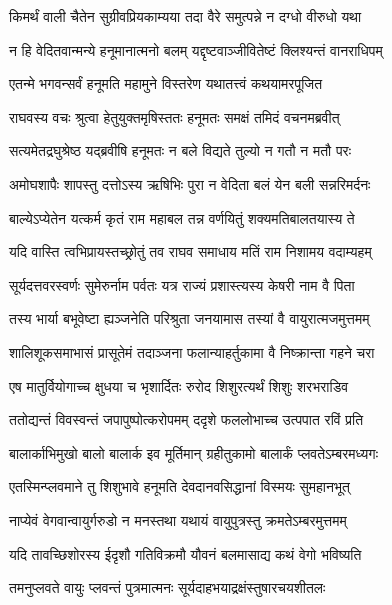 \twolineshloka
{किमर्थं वाली चैतेन सुग्रीवप्रियकाम्यया}
{तदा वैरे समुत्पन्ने न दग्धो वीरुधो यथा} %

\twolineshloka
{न हि वेदितवान्मन्ये हनूमानात्मनो बलम्}
{यद्दृष्टवाञ्जीवितेष्टं क्लिश्यन्तं वानराधिपम्} %

\twolineshloka
{एतन्मे भगवन्सर्वं हनूमति महामुने}
{विस्तरेण यथातत्त्वं कथयामरपूजित} %

\twolineshloka
{राघवस्य वचः श्रुत्वा हेतुयुक्तमृषिस्ततः}
{हनूमतः समक्षं तमिदं वचनमब्रवीत्} %

\twolineshloka
{सत्यमेतद्रघुश्रेष्ठ यद्ब्रवीषि हनूमतः}
{न बले विद्यते तुल्यो न गतौ न मतौ परः} %

\twolineshloka
{अमोघशापैः शापस्तु दत्तोऽस्य ऋषिभिः पुरा}
{न वेदिता बलं येन बली सन्नरिमर्दनः} %

\twolineshloka
{बाल्येऽप्येतेन यत्कर्म कृतं राम महाबल}
{तन्न वर्णयितुं शक्यमतिबालतयास्य ते} %

\twolineshloka
{यदि वास्ति त्वभिप्रायस्तच्छ्रोतुं तव राघव}
{समाधाय मतिं राम निशामय वदाम्यहम्} %

\twolineshloka
{सूर्यदत्तवरस्वर्णः सुमेरुर्नाम पर्वतः}
{यत्र राज्यं प्रशास्त्यस्य केषरी नाम वै पिता} %

\twolineshloka
{तस्य भार्या बभूवेष्टा ह्यञ्जनेति परिश्रुता}
{जनयामास तस्यां वै वायुरात्मजमुत्तमम्} %

\twolineshloka
{शालिशूकसमाभासं प्रासूतेमं तदाञ्जना}
{फलान्याहर्तुकामा वै निष्क्रान्ता गहने चरा} %

\twolineshloka
{एष मातुर्वियोगाच्च क्षुधया च भृशार्दितः}
{रुरोद शिशुरत्यर्थं शिशुः शरभराडिव} %

\twolineshloka
{ततोद्यन्तं विवस्वन्तं जपापुष्पोत्करोपमम्}
{ददृशे फललोभाच्च उत्पपात रविं प्रति} %

\twolineshloka
{बालार्काभिमुखो बालो बालार्क इव मूर्तिमान्}
{ग्रहीतुकामो बालार्कं प्लवतेऽम्बरमध्यगः} %

\twolineshloka
{एतस्मिन्प्लवमाने तु शिशुभावे हनूमति}
{देवदानवसिद्धानां विस्मयः सुमहानभूत्} %

\twolineshloka
{नाप्येवं वेगवान्वायुर्गरुडो न मनस्तथा}
{यथायं वायुपुत्रस्तु क्रमतेऽम्बरमुत्तमम्} %

\twolineshloka
{यदि तावच्छिशोरस्य ईदृशौ गतिविक्रमौ}
{यौवनं बलमासाद्य कथं वेगो भविष्यति} %

\twolineshloka
{तमनुप्लवते वायुः प्लवन्तं पुत्रमात्मनः}
{सूर्यदाहभयाद्रक्षंस्तुषारचयशीतलः} %

